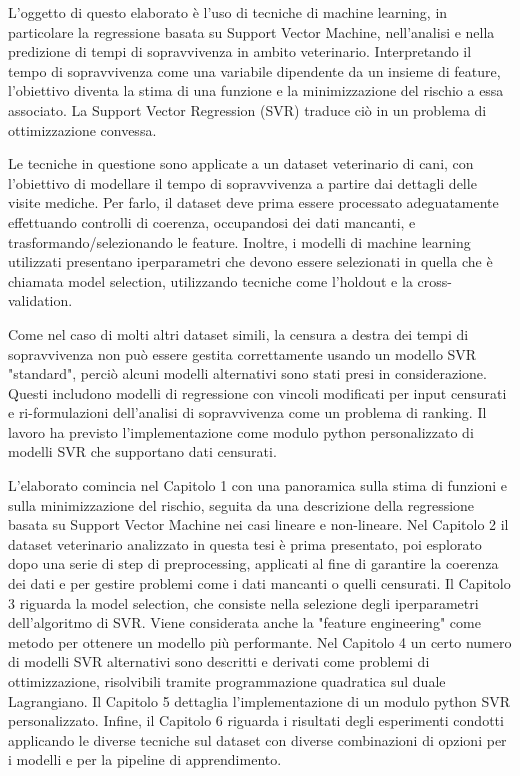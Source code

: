 \documentclass[12pt,a4paper]{report}
\begin{document}
L'oggetto di questo elaborato è l'uso di tecniche di machine learning, in particolare la regressione basata su Support Vector Machine, nell'analisi e nella predizione di tempi di sopravvivenza in ambito veterinario. Interpretando il tempo di sopravvivenza come una variabile dipendente da un insieme di feature, l'obiettivo diventa la stima di una funzione e la minimizzazione del rischio a essa associato. La Support Vector Regression (SVR) traduce ciò in un problema di ottimizzazione convessa.

Le tecniche in questione sono applicate a un dataset veterinario di cani, con l'obiettivo di modellare il tempo di sopravvivenza a partire dai dettagli delle visite mediche. Per farlo, il dataset deve prima essere processato adeguatamente effettuando controlli di coerenza, occupandosi dei dati mancanti, e trasformando/selezionando le feature. Inoltre, i modelli di machine learning utilizzati presentano iperparametri che devono essere selezionati in quella che è chiamata model selection, utilizzando tecniche come l'holdout e la cross-validation.

Come nel caso di molti altri dataset simili, la censura a destra dei tempi di sopravvivenza non può essere gestita correttamente usando un modello SVR "standard", perciò alcuni modelli alternativi sono stati presi in considerazione. Questi includono modelli di regressione con vincoli modificati per input censurati e ri-formulazioni dell'analisi di sopravvivenza come un problema di ranking. Il lavoro ha previsto l'implementazione come modulo python personalizzato di modelli SVR che supportano dati censurati.

L'elaborato comincia nel Capitolo 1 con una panoramica sulla stima di funzioni e sulla minimizzazione del rischio, seguita da una descrizione della regressione basata su Support Vector Machine nei casi lineare e non-lineare. Nel Capitolo 2 il dataset veterinario analizzato in questa tesi è prima presentato, poi esplorato dopo una serie di step di preprocessing, applicati al fine di garantire la coerenza dei dati e per gestire problemi come i dati mancanti o quelli censurati. Il Capitolo 3 riguarda la model selection, che consiste nella selezione degli iperparametri dell'algoritmo di SVR. Viene considerata anche la "feature engineering" come metodo per ottenere un modello più performante. Nel Capitolo 4 un certo numero di modelli SVR alternativi sono descritti e derivati come problemi di ottimizzazione, risolvibili tramite programmazione quadratica sul duale Lagrangiano. Il Capitolo 5 dettaglia l'implementazione di un modulo python SVR personalizzato. Infine, il Capitolo 6 riguarda i risultati degli esperimenti condotti applicando le diverse tecniche sul dataset con diverse combinazioni di opzioni per i modelli e per la pipeline di apprendimento.
\end{document}

